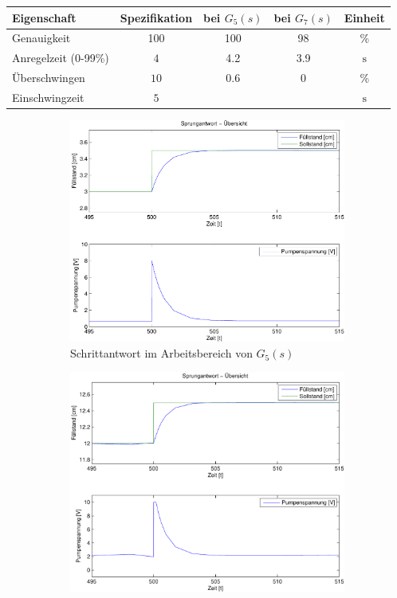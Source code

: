 \begin{table}[h!]
	\centering
	\begin{tabular}{l c c c c}
		Eigenschaft
			& Spezifikation
			& bei $G_5(s)$
			& bei $G_7(s)$
			& Einheit \\
		\hline
		Genauigkeit
			& 100
			& 100
			& 98 
			& \% \\
		Anregelzeit (0-99\%)
			& $4$
			& 4.2
			& 3.9
			& $\si{\second}$ \\
		Überschwingen
			& $10$
			& 0.6
			& 0
			& \% \\
		Einschwingzeit
			& $5$
			& 
			&
			& $\si{\second}$ \\
	\end{tabular}
\end{table}

\begin{figure}[h!]
	\centering
	\begin{subfigure}{0.475\textwidth}
		\includegraphics[width=1\textwidth]{11/L5_step_overview_plot.pdf}
		\caption{Schrittantwort im Arbeitsbereich von $G_5(s)$}
	\end{subfigure}
	\hfill{}
	\begin{subfigure}{0.475\textwidth}
		\includegraphics[width=1\textwidth]{11/L7_step_overview_plot.pdf}

\end{subfigure}
\end{figure}
